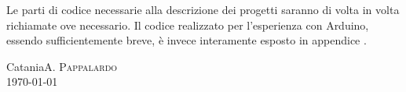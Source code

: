     Le parti di codice necessarie alla descrizione dei progetti saranno di volta in volta richiamate ove necessario. Il codice realizzato per l'esperienza con Arduino, essendo sufficientemente breve, è invece interamente esposto in appendice .

    \bigskip\noindent
    Catania\hfill\textsc{A. Pappalardo}\\\today